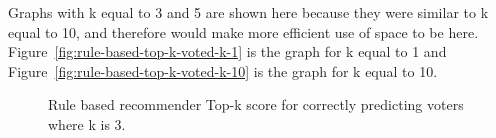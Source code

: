 Graphs with k equal to 3 and 5 are shown here because they were similar to k equal to 10, and therefore would make more efficient use of space to be here. Figure~\ref{fig:rule-based-top-k-voted-k-1} is the graph for k equal to 1 and Figure~\ref{fig:rule-based-top-k-voted-k-10} is the graph for k equal to 10.

\begin{figure}[H]%
    \centering
    \caption{Rule based recommender Top-k score for correctly predicting voters where k is 3.}%
    \label{fig:rule-based-top-k-voted-k-3-appendix-c}%
\end{figure}

